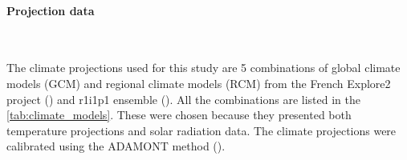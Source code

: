 \documentclass[11pt]{article}
\begin{document}

        \paragraph{Projection data}\mbox{}\\ %
        \label{par:proj_data}

        The climate projections used for this study are 5 combinations of global climate models (GCM) and regional climate models (RCM) from the French Explore2 project (\cite{sauquet_explore2_2021}) and r1i1p1 ensemble (\cite{taylor_cmip5_2010}). All the combinations are listed in the \ref{tab:climate_models}. These were chosen because they presented both temperature projections and solar radiation data. The climate projections were calibrated using the ADAMONT method (\cite{verfaillie_method_2017}).\\
\end{document}
